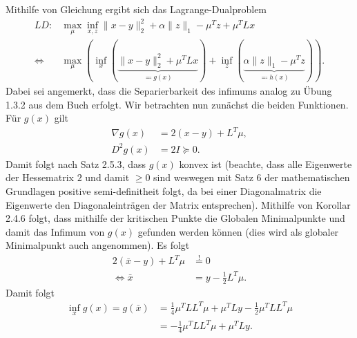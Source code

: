 \documentclass[ngerman, a4paper,12pt]{article}
\begin{document}
Mithilfe von Gleichung  ergibt sich das Lagrange-Dualproblem
\begin{equation*}
	\begin{split}
	LD: &\max_{\mu} \inf_{x,z} \|x-y\|_2^2+\alpha\|z\|_1 - \mu^Tz + \mu^TLx \\
			\Leftrightarrow &\max_{\mu} \left( \inf_{x} \left( \underbrace{\|x-y\|_2^2 + \mu^TLx}_{\eqqcolon g(x)}  \right) + \inf_{z} \left( 
			\underbrace{\alpha\|z\|_1 - \mu^Tz}_{\eqqcolon h(x)}  \right) \right).
	\end{split}
\end{equation*}
Dabei sei angemerkt, dass die Separierbarkeit des infimums analog zu Übung 1.3.2 aus dem Buch erfolgt.
Wir betrachten nun zunächst die beiden Funktionen.
Für $g(x)$ gilt
\begin{equation*}
	\begin{split}
		\nabla g(x) &= 2(x-y) + L^T\mu, \\
		D^2 g(x) &= 2 I \succeq 0.
	\end{split}
\end{equation*}
Damit folgt nach Satz 2.5.3, dass $g(x)$ konvex ist (beachte, dass alle Eigenwerte der Hessematrix $2$ und damit $\geq 0$ sind weswegen mit Satz 6 der mathematischen Grundlagen positive semi-definitheit folgt, da bei einer Diagonalmatrix die Eigenwerte den Diagonaleinträgen der Matrix entsprechen). Mithilfe von Korollar 2.4.6 folgt, dass mithilfe der kritischen Punkte die Globalen Minimalpunkte und damit das Infimum von $g(x)$ gefunden werden können (dies wird als globaler Minimalpunkt auch angenommen). Es folgt
\begin{equation*}
	\begin{split}
	  2( \bar{x}-y)+L^T\mu &\stackrel{!}{=}0 \\
	  \Leftrightarrow \bar{x}&=y-\frac{1}{2} L^T\mu.
	\end{split}
\end{equation*}
Damit folgt 
\begin{equation*}
	\begin{split}
		\inf_x g(x) = g( \bar{x} ) &=\frac{1}{4}\mu^TLL^T\mu+\mu^TLy-\frac{1}{2}\mu^TLL^T\mu \\ &=-\frac{1}{4}\mu^TLL^T\mu+\mu^TLy.
	\end{split}
\end{equation*}
\end{document}
